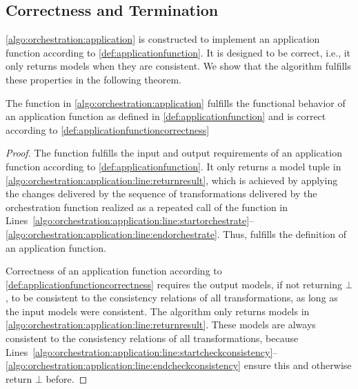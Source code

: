 



\subsection{Correctness and Termination}

\autoref{algo:orchestration:application} is constructed to implement an application function according to \autoref{def:applicationfunction}.
It is designed to be correct, i.e., it only returns models when they are consistent.
We show that the algorithm fulfills these properties in the following theorem.

\begin{theorem}
    The  function in \autoref{algo:orchestration:application} fulfills the functional behavior of an application function as defined in \autoref{def:applicationfunction} and is correct according to \autoref{def:applicationfunctioncorrectness}
\end{theorem}
\begin{proof}
    The  function fulfills the input and output requirements of an application function according to \autoref{def:applicationfunction}.
    It only returns a model tuple in \autoref{algo:orchestration:application:line:returnresult}, which is achieved by applying the changes delivered by the sequence of transformations delivered by the orchestration function realized as a repeated call of the  function in Lines~\ref{algo:orchestration:application:line:startorchestrate}--\ref{algo:orchestration:application:line:endorchestrate}.
    Thus,  fulfills the definition of an application function.

    Correctness of an application function according to \autoref{def:applicationfunctioncorrectness} requires the output models, if not returning $\bot$, to be consistent to the consistency relations of all transformations, as long as the input models were consistent.
    The algorithm only returns models in \autoref{algo:orchestration:application:line:returnresult}.
    These models are always consistent to the consistency relations of all transformations, because Lines~\ref{algo:orchestration:application:line:startcheckconsistency}--\ref{algo:orchestration:application:line:endcheckconsistency} ensure this and otherwise return $\bot$ before.
\end{proof}

